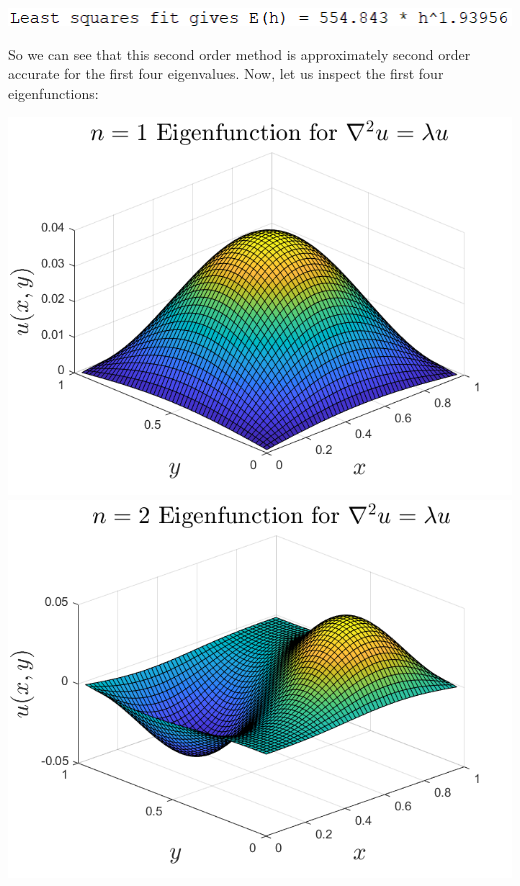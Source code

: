 \documentclass{article}
\begin{document}
\begin{enumerate}
\begin{center}
        \includegraphics[scale = 0.6]{lam4err.PNG}
    \end{center}
    So we can see that this second order method is approximately second order accurate for the first four eigenvalues. Now, let us inspect the first four eigenfunctions:
    \begin{center}
        \includegraphics[scale = 0.4]{n1eig.png}
        \includegraphics[scale = 0.4]{n2eig.png}
        \newline

\end{center}
\end{enumerate}
\end{document}

